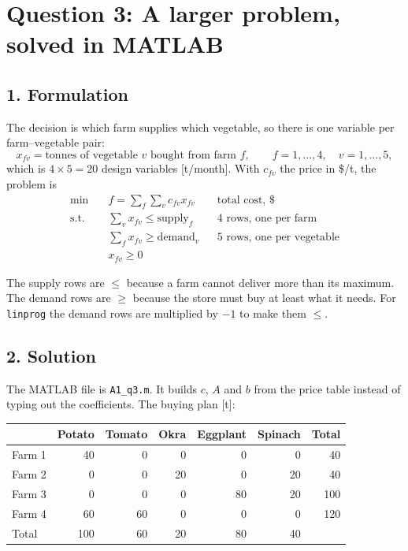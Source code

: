 \documentclass[11pt,a4paper]{article}
\begin{document}
\newpage
\section*{Question 3: A larger problem, solved in MATLAB}

\subsection*{1. Formulation}

The decision is which farm supplies which vegetable, so there is one variable
per farm--vegetable pair:
\[
  x_{fv} = \text{tonnes of vegetable } v \text{ bought from farm } f,
  \qquad f = 1,\dots,4, \quad v = 1,\dots,5,
\]
which is $4 \times 5 = 20$ design variables [t/month]. With $c_{fv}$ the price
in \$/t, the problem is
\begin{align*}
  \min \quad & f = \sum_f \sum_v c_{fv} x_{fv} && \text{total cost, \$} \\
  \text{s.t.} \quad
  & \sum_v x_{fv} \le \text{supply}_f && \text{4 rows, one per farm} \\
  & \sum_f x_{fv} \ge \text{demand}_v && \text{5 rows, one per vegetable} \\
  & x_{fv} \ge 0
\end{align*}

The supply rows are $\le$ because a farm cannot deliver more than its maximum.
The demand rows are $\ge$ because the store must buy at least what it needs.
For \texttt{linprog} the demand rows are multiplied by $-1$ to make them $\le$.

\subsection*{2. Solution}

The MATLAB file is \texttt{A1\_q3.m}. It builds $c$, $A$ and $b$ from the price
table instead of typing out the coefficients. The buying plan [t]:

\begin{center}
\begin{tabular}{lrrrrrr}
\toprule
 & Potato & Tomato & Okra & Eggplant & Spinach & Total \\
\midrule
Farm 1 & 40  & 0  & 0  & 0  & 0  & 40 \\
Farm 2 & 0   & 0  & 20 & 0  & 20 & 40 \\
Farm 3 & 0   & 0  & 0  & 80 & 20 & 100 \\
Farm 4 & 60  & 60 & 0  & 0  & 0  & 120 \\
\midrule
Total  & 100 & 60 & 20 & 80 & 40 & \\
\bottomrule
\end{tabular}
\end{center}
\end{document}
